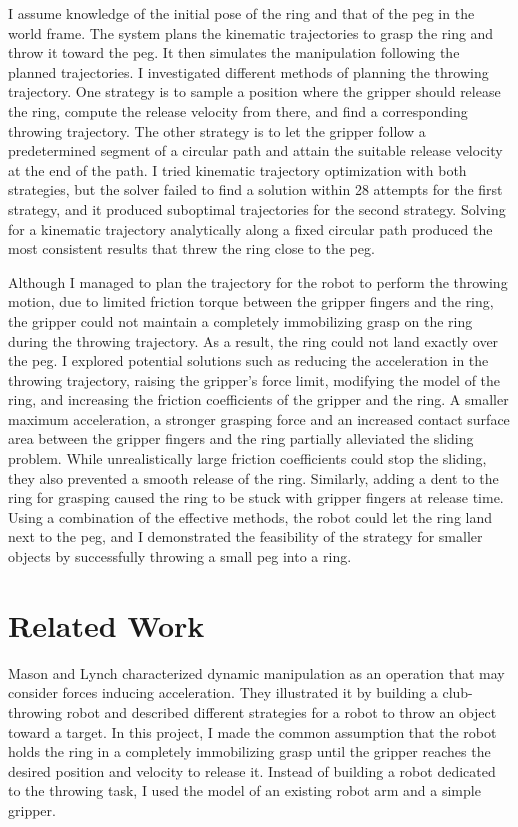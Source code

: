 \documentclass[conference]{IEEEtran}
\begin{document}
I assume knowledge of the initial pose of the ring and that of the peg in the world frame. The system plans the kinematic trajectories to grasp the ring and throw it toward the peg. It then simulates the manipulation following the planned trajectories. I investigated different methods of planning the throwing trajectory. One strategy is to sample a position where the gripper should release the ring, compute the release velocity from there, and find a corresponding throwing trajectory. The other strategy is to let the gripper follow a predetermined segment of a circular path and attain the suitable release velocity at the end of the path. I tried kinematic trajectory optimization with both strategies, but the solver failed to find a solution within 28 attempts for the first strategy, and it produced suboptimal trajectories for the second strategy. Solving for a kinematic trajectory analytically along a fixed circular path produced the most consistent results that threw the ring close to the peg.

Although I managed to plan the trajectory for the robot to perform the throwing motion, due to limited friction torque between the gripper fingers and the ring, the gripper could not maintain a completely immobilizing grasp on the ring during the throwing trajectory. As a result, the ring could not land exactly over the peg. I explored potential solutions such as reducing the acceleration in the throwing trajectory, raising the gripper's force limit, modifying the model of the ring, and increasing the friction coefficients of the gripper and the ring. A smaller maximum acceleration, a stronger grasping force and an increased contact surface area between the gripper fingers and the ring partially alleviated the sliding problem. While unrealistically large friction coefficients could stop the sliding, they also prevented a smooth release of the ring. Similarly, adding a dent to the ring for grasping caused the ring to be stuck with gripper fingers at release time. Using a combination of the effective methods, the robot could let the ring land next to the peg, and I demonstrated the feasibility of the strategy for smaller objects by successfully throwing a small peg into a ring.

\section{Related Work}
Mason and Lynch \cite{mason1993dynamic} characterized dynamic manipulation as an operation that may consider forces inducing acceleration. They illustrated it by building a club-throwing robot and described different strategies for a robot to throw an object toward a target. In this project, I made the common assumption that the robot holds the ring in a completely immobilizing grasp until the gripper reaches the desired position and velocity to release it. Instead of building a robot dedicated to the throwing task, I used the model of an existing robot arm and a simple gripper.
\end{document}
